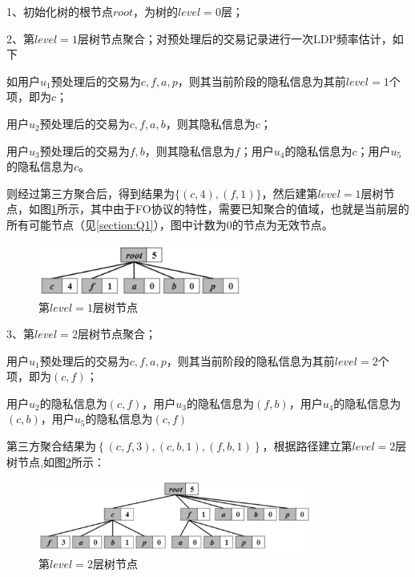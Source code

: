 \documentclass[UTF8]{ctexart}
\begin{document}
1、初始化树的根节点$root$，为树的$level=0$层；

2、第$level=1$层树节点聚合；对预处理后的交易记录进行一次LDP频率估计，如下

如用户$u_{1}$预处理后的交易为{\color{red}$c,f,a,p$}，则其当前阶段的隐私信息为其前$level=1$个项，即为$c$；

用户$u_{2}$预处理后的交易为{\color{red}$c,f,a,b$}，则其隐私信息为$c$；

用户$u_{3}$预处理后的交易为{\color{red}$f,b$}，则其隐私信息为$f$；用户$u_{4}$的隐私信息为$c$；用户$u_{5}$的隐私信息为$c$。

则经过第三方聚合后，得到结果为$\{(c,4),(f,1)\}$，然后建第$level=1$层树节点，如图\ref{figure:levelone}所示，其中由于FO协议的特性，需要已知聚合的值域，也就是当前层的所有可能节点（见\ref{section:Q1}），图中计数为0的节点为无效节点。

  \begin{figure}[h]
    \centering
    \includegraphics[width=0.6\textwidth]{level_1.pdf}
    \caption{第$level=1$层树节点}
    \label{figure:levelone}
  \end{figure}

3、第$level=2$层树节点聚合；

用户$u_{1}$预处理后的交易为{\color{red}$c,f,a,p$}，则其当前阶段的隐私信息为其前$level=2$个项，即为$(c,f)$；

用户$u_{2}$的隐私信息为$(c,f)$，用户$u_{3}$的隐私信息为$(f,b)$，用户$u_{4}$的隐私信息为$(c,b)$，用户$u_{5}$的隐私信息为$(c,f)$

第三方聚合结果为$\left \{ (c,f,3) , (c,b,1) , (f,b,1) \right \}$，根据路径建立第$level=2$层树节点,如图\ref{figure:leveltwo}所示：

  \begin{figure}[h]
    \centering
    \includegraphics[width=0.8\textwidth]{level_2.pdf}
    \caption{第$level=2$层树节点}
    \label{figure:leveltwo}
  \end{figure}
\end{document}
